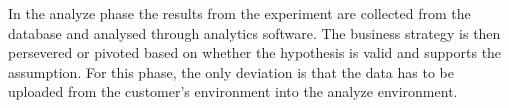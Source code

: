 \documentclass[english, grading]{tktltiki2}
\theoremstyle{definition}
\theoremstyle{remark}
\begin{document}
In the analyze phase the results from the experiment are collected from the database and analysed through analytics software. The business strategy is then persevered or pivoted based on whether the hypothesis is valid and supports the assumption. For this phase, the only deviation is that the data has to be uploaded from the customer's environment into the analyze environment.






















\end{document}
